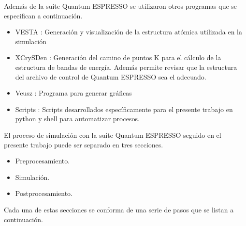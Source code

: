 \noindent Adem\'as de la suite Quantum ESPRESSO se utilizaron otros programas 
que se especifican a continuaci\'on.

\begin{itemize}
    \item VESTA : Generaci\'on y visualizaci\'on de la estructura at\'omica 
    utilizada en la simulaci\'on
    \item XCrySDen : Generaci\'on del camino de puntos K para el c\'alculo de 
    la estructura de bandas de energ\'ia. Adem\'as permite revisar que la 
    estructura del archivo de control de Quantum ESPRESSO sea el adecuado.
    \item Veusz : Programa para generar gr\'aficas
    \item Scripts : Scripts desarrollados espec\'ificamente para el 
    presente trabajo en python y shell para automatizar procesos.
\end{itemize}

\noindent El proceso de simulaci\'on con la suite Quantum ESPRESSO seguido en 
el presente trabajo puede ser separado en tres secciones.

\begin{itemize}
    \item Preprocesamiento.
    \item Simulaci\'on.
    \item Postprocesamiento.
\end{itemize}

\noindent Cada una de estas secciones se conforma de una serie de pasos que 
se listan 
a continuaci\'on.

